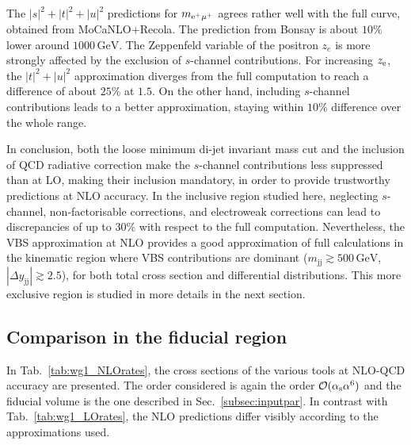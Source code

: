 \documentclass[twocolumn,epjc3]{svjour3} %
\newcommand{\Pj}{\ensuremath{\text{j}}\xspace}
\newcommand{\GeV}{\ensuremath{\,\text{GeV}}\xspace}
\begin{document}
    The $|s|^2+|t|^2+|u|^2$ predictions for $m_{\rm e^+\mu^+}$ agrees rather well with the full curve, obtained from {\sc MoCa\-NLO+Recola}.
    The prediction from {\sc Bonsay} is about $10\%$ lower around $1000 \GeV$.
    The Zeppenfeld variable of the positron $z_e$ is more strongly affected by the exclusion of $s$-channel contributions.
    For increasing $z_{\rm e}$, the $|t|^2+|u|^2$ approximation diverges from the full computation to reach a difference of about $25\%$ at $1.5$.
    On the other hand, including $s$-channel contributions leads to a better approximation, staying within $10\%$ difference over the whole range.

    In conclusion, both the loose minimum di-jet invariant mass cut and the inclusion of QCD radiative correction make the $s$-channel contributions less suppressed than at LO, making their inclusion mandatory, in order to provide trustworthy predictions at NLO accuracy.
    In the inclusive region studied here, neglecting $s$-channel, non-factorisable corrections, and electroweak corrections can lead to discrepancies of up to $30\%$ with respect to the full computation.
    Nevertheless, the VBS approximation at NLO provides a good approximation of full calculations in the kinematic region where VBS contributions are dominant ($m_{\Pj\Pj} \gtrsim 500 \GeV$, $|\Delta y_{\Pj\Pj}| \gtrsim 2.5$), for both total cross section and differential distributions.
    This more exclusive region is studied in more details in the next section.
    \subsection{Comparison in the fiducial region}
    \label{sec:fidNLO}
    In Tab.~\ref{tab:wg1_NLOrates}, the cross sections of the various tools at NLO-QCD accuracy are presented.
    The order considered is again the order $\mathcal{O}(\alpha_{\rm s}\alpha^6)$ and the fiducial volume is the one described in Sec.~\ref{subsec:inputpar}.
    In contrast with Tab.~\ref{tab:wg1_LOrates}, the NLO predictions differ visibly according to the approximations used.
\end{document}
